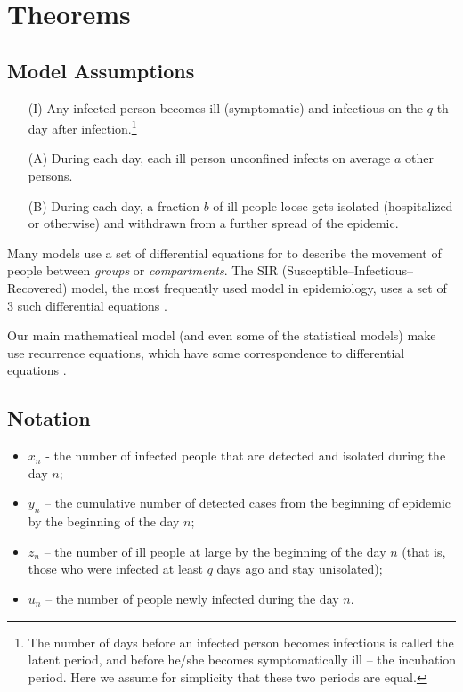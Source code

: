 \section{Theorems}
\label{ch:theorems}

\subsection{Model Assumptions}
\begin{itemize}
    \item[(I)] Any infected person becomes ill (symptomatic) and infectious on the $q$-th day after infection.\footnote{The number of days before an infected person becomes infectious is called the latent period, and before he/she becomes symptomatically ill – the incubation period. Here we assume for simplicity that these two periods are equal.}
    \item[(A)] During each day, each ill person unconfined infects on average $a$ other persons.
    \item[(B)] During each day, a fraction $b$ of ill people loose gets isolated (hospitalized or otherwise) and withdrawn from a further spread of the epidemic.
\end{itemize}

Many models use a set of differential equations for to describe the movement of people between \textit{groups} or \textit{compartments}\cite{Parshani_2010, diffeqmodels14, NBERw27128}. The SIR (Susceptible–Infectious–Recovered) model, the most frequently used model in epidemiology, uses a set of 3 such differential equations \cite{Anderson1991, sir-intro-2020}. 

Our main mathematical model (and even some of the statistical models) make use recurrence equations, which have some correspondence to differential equations \cite{AGARWAL20021}.

\subsection{Notation}
\begin{itemize}
    \item $x_n$ - the number of infected people that are detected and isolated during the day $n$;
    \item $y_n$ – the cumulative number of detected cases from the beginning of epidemic by the beginning of the day $n$;
    \item $z_n$ – the number of ill people at large by the beginning of the day $n$ (that is, those who were infected at least $q$ days ago and stay unisolated);
    \item $u_n$ – the number of people newly infected during the day $n$.
\end{itemize}

